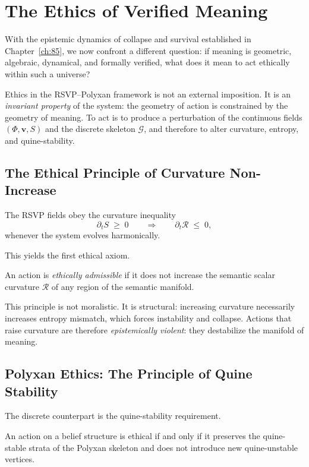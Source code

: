 \chapter{The Ethics of Verified Meaning}
\label{ch:86}

With the epistemic dynamics of collapse and survival established in
Chapter~\ref{ch:85}, we now confront a different question:
if meaning is geometric, algebraic, dynamical, and formally verified,
what does it mean to act ethically within such a universe?

Ethics in the RSVP--Polyxan framework is not an external imposition.
It is an \emph{invariant property} of the system: the geometry of action
is constrained by the geometry of meaning.
To act is to produce a perturbation of the continuous fields
$(\Phi,\mathbf{v},S)$ and the discrete skeleton
$\mathcal{G}$, and therefore to alter curvature, entropy, and
quine-stability.

\section{The Ethical Principle of Curvature Non-Increase}

The RSVP fields obey the curvature inequality
\[
\partial_t S \;\ge\; 0
\qquad\Longrightarrow\qquad
\partial_t \mathcal{R} \;\le\; 0,
\]
whenever the system evolves harmonically.

This yields the first ethical axiom.

\begin{definition}
An action is \emph{ethically admissible} if it does not increase the
semantic scalar curvature $\mathcal{R}$ of any region of the semantic
manifold.
\end{definition}

This principle is not moralistic.  
It is structural: increasing curvature necessarily
increases entropy mismatch, which forces instability and collapse.
Actions that raise curvature are therefore \emph{epistemically violent}:
they destabilize the manifold of meaning.

\section{Polyxan Ethics: The Principle of Quine Stability}

The discrete counterpart is the quine-stability requirement.

\begin{definition}
An action on a belief structure is ethical if and only if it preserves
the quine-stable strata of the Polyxan skeleton and does not introduce
new quine-unstable vertices.
\end{definition}

